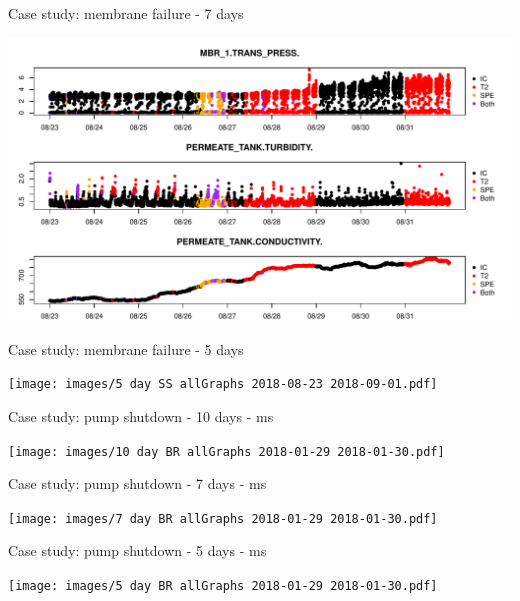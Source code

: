 \documentclass{beamer}
\begin{document}
\begin{frame}{Case study: membrane failure - 7 days}
\protect\hypertarget{case-study-membrane-failure---7-days}{}

\includegraphics{images/7 day SS allGraphs 2018-08-23 2018-09-01.pdf}

\end{frame}

\begin{frame}{Case study: membrane failure - 5 days}
\protect\hypertarget{case-study-membrane-failure---5-days}{}

\texttt{[image: images/5 day SS allGraphs 2018-08-23 2018-09-01.pdf]}

\end{frame}

\begin{frame}{Case study: pump shutdown - 10 days - ms}
\protect\hypertarget{case-study-pump-shutdown---10-days---ms}{}

\texttt{[image: images/10 day BR allGraphs 2018-01-29 2018-01-30.pdf]}

\end{frame}

\begin{frame}{Case study: pump shutdown - 7 days - ms}
\protect\hypertarget{case-study-pump-shutdown---7-days---ms}{}

\texttt{[image: images/7 day BR allGraphs 2018-01-29 2018-01-30.pdf]}

\end{frame}

\begin{frame}{Case study: pump shutdown - 5 days - ms}
\protect\hypertarget{case-study-pump-shutdown---5-days---ms}{}

\texttt{[image: images/5 day BR allGraphs 2018-01-29 2018-01-30.pdf]}

\end{frame}
\end{document}

